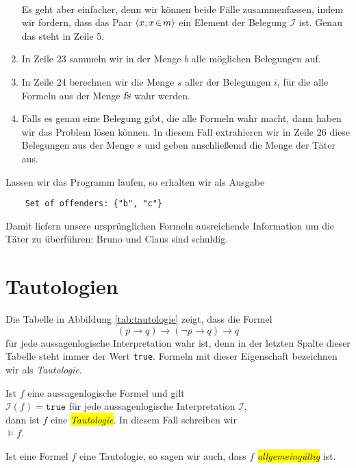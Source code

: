 \begin{enumerate}
      \\[0.2cm]
      Es geht aber einfacher, denn wir k\"{o}nnen beide F\"{a}lle zusammenfassen, indem wir fordern,
      dass das Paar $\pair(x, x \el m)$ ein Element der Belegung $\mathcal{I}$ ist. Genau
      das steht in Zeile 5.
\item In Zeile 23 sammeln wir in der Menge $b$ alle m\"{o}glichen Belegungen auf.
\item In Zeile 24 berechnen wir die Menge $s$ aller der Belegungen $i$, f\"{u}r die alle 
      Formeln aus der Menge $\textsl{fs}$ wahr werden. 
\item Falls es genau eine Belegung gibt, die alle Formeln wahr macht, 
      dann haben wir das Problem l\"{o}sen k\"{o}nnen.  In diesem Fall
      extrahieren wir in Zeile 26 diese Belegungen aus der Menge $s$ und geben
      anschlie\ss{}emd die Menge der T\"{a}ter aus.
\end{enumerate}
Lassen wir das Programm laufen, so erhalten wir als Ausgabe
\begin{verbatim}
    Set of offenders: {"b", "c"}
\end{verbatim}
Damit liefern unsere urspr\"{u}nglichen Formeln ausreichende Information um die T\"{a}ter zu \"{u}berf\"{u}hren:
Bruno und Claus sind schuldig.


\section{Tautologien}
Die Tabelle in Abbildung \ref{tab:tautologie} zeigt, dass die Formel
$$  (p \rightarrow q) \rightarrow (\neg p \rightarrow q) \rightarrow q $$
f\"{u}r jede aussagenlogische Interpretation wahr ist, denn in der letzten Spalte dieser Tabelle steht immer der
Wert \texttt{true}.  Formeln mit dieser Eigenschaft  bezeichnen wir als \emph{Tautologie}.
\begin{Definition}[Tautologie]
  Ist $f$ eine aussagenlogische Formel und gilt \\[0.2cm]
  \hspace*{1.3cm} $\mathcal{I}(f) = \mathtt{true}$ \quad f\"{u}r jede aussagenlogische Interpretation $\mathcal{I}$, \\[0.2cm]
  dann ist $f$ eine \colorbox{yellow}{\emph{Tautologie}}.  In diesem Fall schreiben wir \\[0.2cm]
  \hspace*{1.3cm} $\models f$.
  \eox
\end{Definition}

\noindent
Ist eine Formel $f$ eine Tautologie, so sagen wir auch, dass $f$
\colorbox{yellow}{\emph{allgemeing\"{u}ltig}} ist.

